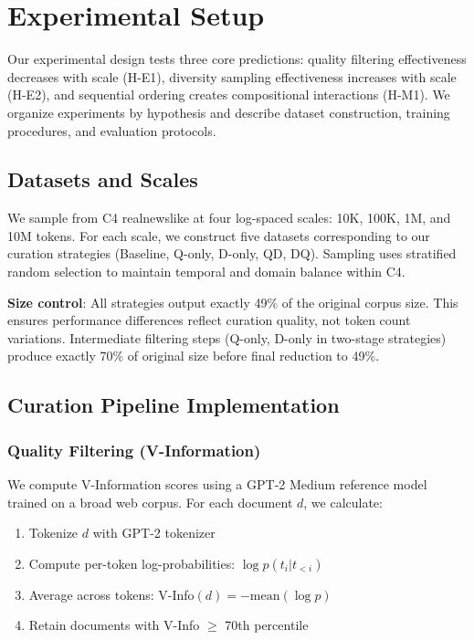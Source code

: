 \section{Experimental Setup}

Our experimental design tests three core predictions: quality filtering effectiveness decreases with scale (H-E1), diversity sampling effectiveness increases with scale (H-E2), and sequential ordering creates compositional interactions (H-M1). We organize experiments by hypothesis and describe dataset construction, training procedures, and evaluation protocols.

\subsection{Datasets and Scales}

We sample from C4 realnewslike at four log-spaced scales: 10K, 100K, 1M, and 10M tokens. For each scale, we construct five datasets corresponding to our curation strategies (Baseline, Q-only, D-only, QD, DQ). Sampling uses stratified random selection to maintain temporal and domain balance within C4.

\textbf{Size control}: All strategies output exactly 49\% of the original corpus size. This ensures performance differences reflect curation quality, not token count variations. Intermediate filtering steps (Q-only, D-only in two-stage strategies) produce exactly 70\% of original size before final reduction to 49\%.

\subsection{Curation Pipeline Implementation}

\subsubsection{Quality Filtering (V-Information)}

We compute V-Information scores using a GPT-2 Medium reference model trained on a broad web corpus. For each document $d$, we calculate:

\begin{enumerate}
\item Tokenize $d$ with GPT-2 tokenizer
\item Compute per-token log-probabilities: $\log p(t_i | t_{<i})$
\item Average across tokens: V-Info$(d) = -\text{mean}(\log p)$
\item Retain documents with V-Info $\geq$ 70th percentile
\end{enumerate}

